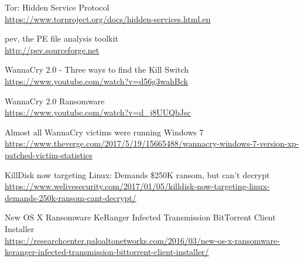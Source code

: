 \documentclass[10pt,a4paper]{article}
\begin{document}
\begin{thebibliography}{1}
Tor: Hidden Service Protocol
\\\url{https://www.torproject.org/docs/hidden-services.html.en}

pev, the PE file analysis toolkit
\\\url{http://pev.sourceforge.net}

WannaCry 2.0 - Three ways to find the Kill Switch
\\\url{https://www.youtube.com/watch?v=d56g3wahBck}

WannaCry 2.0 Ransomware
\\\url{https://www.youtube.com/watch?v=d\_j8UUQbJsc}

Almost all WannaCry victims were running Windows 7
\\\url{https://www.theverge.com/2017/5/19/15665488/wannacry-windows-7-version-xp-patched-victim-statistics}

KillDisk now targeting Linux: Demands \$250K ransom, but can’t decrypt
\\\url{https://www.welivesecurity.com/2017/01/05/killdisk-now-targeting-linux-demands-250k-ransom-cant-decrypt/}

New OS X Ransomware KeRanger Infected Transmission BitTorrent Client Installer
\\\url{https://researchcenter.paloaltonetworks.com/2016/03/new-os-x-ransomware-keranger-infected-transmission-bittorrent-client-installer/}

\end{thebibliography}
\end{document}
